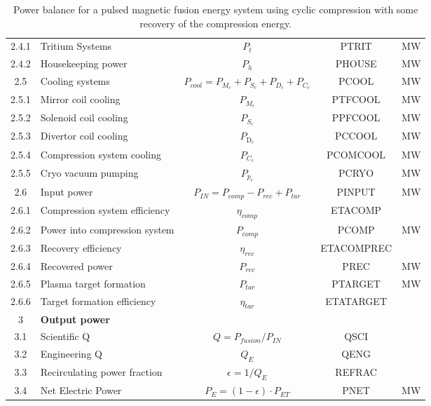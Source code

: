 \begin{table}[ht!]
\begin{tabular}{|c|p{5cm}|c|c|c|}
2.4.1	&	Tritium Systems	&	$P_{{t}}$	&	PTRIT	&	MW \\
2.4.2	&	Housekeeping power	&	$P_{{h}}$	&	PHOUSE	&	MW \\
2.5	&	Cooling systems	&	$P_{cool} = P_{{M}_c} + P_{{S}_c} + P_{{D}_c}+ P_{{C}_c}$	&	PCOOL	&	MW \\
2.5.1	&	Mirror coil cooling	&	$P_{{M}_c}$	&	PTFCOOL	&	MW \\
2.5.2	&	Solenoid coil cooling	&	$P_{{S}_c}$	&	PPFCOOL	&	MW \\
2.5.3 & Divertor coil cooling & $P_{\text{D}_c}$ & PCCOOL & MW \\
2.5.4	&	Compression system cooling	&	$P_{{C}_c}$	&	PCOMCOOL	&	MW \\
2.5.5	&	Cryo vacuum pumping	&	$P_{{p}_c}$	&	PCRYO	&	MW \\
2.6	& Input power	& $P_{IN} = P_{comp}-P_{{rec}} + P_{tar}$	&	PINPUT	&	MW \\
2.6.1	&	Compression system efficiency	&	$\eta_{{comp}}$	&	ETACOMP	&	\\
2.6.2	&	Power into compression system	&	$P_{{comp}}$	&	PCOMP	&	MW \\
2.6.3	&	Recovery efficiency	&	$\eta_{{rec}}$	&	ETACOMPREC	&	 \\
2.6.4	&	Recovered power	&	$P_{{rec}}$	&	PREC	&	MW \\
2.6.5	&	Plasma target formation	&	$P_{{tar}}$	&	PTARGET	&	MW \\
2.6.6	&	Target formation efficiency	&	$\eta_{tar}$	&	ETATARGET	&	 \\

\hline								
3	&	\textbf{Output power}	&		&		&	\\
\hline
3.1	&	Scientific Q	&	$Q = P_{{fusion}}/P_{{IN}}$	&	QSCI	&	\\
3.2	&	Engineering Q	&	$Q_{{E}}$	&	QENG	&	\\
3.3	&	Recirculating power fraction	&	$\epsilon = 1/Q_{{E}}$	&	REFRAC	&	\\
3.4	&	Net Electric Power	&	$P_{{E}} = (1 - \epsilon) \cdot P_{{ET}}$	&	PNET	&	MW \\
\hline								
\end{tabular}	
\caption{Power balance for a pulsed magnetic fusion energy system using cyclic compression with some recovery of the compression energy.}
\label{tab:powerbalance}
\end{table}



